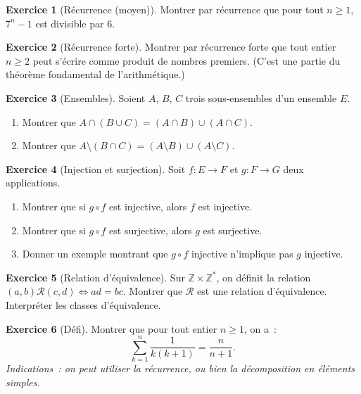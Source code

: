 \documentclass[12pt,a4paper,openany]{book}
\theoremstyle{definition}
\newtheorem{exercice}{Exercice}[chapter]
\newcommand{\Z}{\mathbb{Z}}
\begin{document}
\begin{exercice}[Récurrence (moyen)]\label{exo:exo-recurrence2}
  Montrer par récurrence que pour tout $n \geq 1$, $7^n - 1$ est divisible par $6$.
\end{exercice}

\begin{exercice}[Récurrence forte]\label{exo:exo-recurrence-forte}
  Montrer par récurrence forte que tout entier $n \geq 2$ peut s'écrire comme produit de nombres premiers. (C'est une partie du théorème fondamental de l'arithmétique.)
\end{exercice}

\begin{exercice}[Ensembles]\label{exo:exo-ensembles}
  Soient $A$, $B$, $C$ trois sous-ensembles d'un ensemble $E$.
  \begin{enumerate}[label=(\alph*)]
    \item Montrer que $A \cap (B \cup C) = (A \cap B) \cup (A \cap C)$.
    \item Montrer que $A \setminus (B \cap C) = (A \setminus B) \cup (A \setminus C)$.
  \end{enumerate}
\end{exercice}

\begin{exercice}[Injection et surjection]\label{exo:exo-inj-surj}
  Soit $f : E \to F$ et $g : F \to G$ deux applications.
  \begin{enumerate}[label=(\alph*)]
    \item Montrer que si $g \circ f$ est injective, alors $f$ est injective.
    \item Montrer que si $g \circ f$ est surjective, alors $g$ est surjective.
    \item Donner un exemple montrant que $g \circ f$ injective n'implique pas $g$ injective.
  \end{enumerate}
\end{exercice}

\begin{exercice}[Relation d'équivalence]\label{exo:exo-rel-equiv}
  Sur $\Z \times \Z^*$, on définit la relation $(a,b) \mathrel{\mathcal{R}} (c,d) \Leftrightarrow ad = bc$. Montrer que $\mathcal{R}$ est une relation d'équivalence. Interpréter les classes d'équivalence.
\end{exercice}

\begin{exercice}[Défi]\label{exo:exo-defi-ch1}
  Montrer que pour tout entier $n \geq 1$, on a~:
  \[
    \sum_{k=1}^{n} \frac{1}{k(k+1)} = \frac{n}{n+1}.
  \]
  \emph{Indications~: on peut utiliser la récurrence, ou bien la décomposition en éléments simples.}
\end{exercice}
\end{document}
